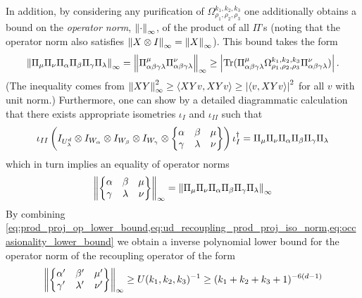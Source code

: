 \documentclass[notitlepage, 10pt]{article}
\begin{document}
In addition, by considering any purification of $\Omega_{\rho_1,\rho_2,\rho_3}^{k_1, k_2, k_3}$ one additionally obtains a bound on the \textit{operator norm}, $\left\lVert\cdot\right\rVert_{\infty}$, of the product of all $\Pi$'s (noting that the operator norm also satisfies $\left\lVert X \otimes I\right\rVert_{\infty} = \left\lVert X\right\rVert_{\infty}$).
This bound takes the form
\begin{equation}
    \label{eq:prod_proj_op_lower_bound}
    \left\lVert\Pi_{\mu}\Pi_{\nu}\Pi_{\alpha}\Pi_{\beta}\Pi_{\gamma}\Pi_{\lambda}\right\rVert_{\infty} = \left\lVert\Pi^{\mu}_{\alpha\beta\gamma\lambda}\Pi^{\nu}_{\alpha\beta\gamma\lambda}\right\rVert_{\infty} \geq \left|\operatorname{Tr}(\Pi^{\mu}_{\alpha\beta\gamma\lambda} \Omega_{\rho_1,\rho_2,\rho_3}^{k_1, k_2, k_3} \Pi^{\nu}_{\alpha\beta\gamma\lambda})\right|.
\end{equation}
(The inequality comes from $\left\lVert XY\right\rVert_{\infty}^2 \geq \braket{XY v, XY v} \geq \left|\braket{v, XYv}\right|^{2}$ for all $v$ with unit norm.)
Furthermore, one can show by a detailed diagrammatic calculation that there exists appropriate isometries $\iota_{I}$ and $\iota_{II}$ such that
\begin{equation}
    \label{eq:ud_recoupling_prod_proj_iso}
    \iota_{II} \left(I_{U^{d}_{\lambda}} \otimes I_{W_{\alpha}} \otimes I_{W_{\beta}} \otimes I_{W_{\gamma}} \otimes \begin{Bmatrix} \alpha & \beta & \mu \\ \gamma & \lambda & \nu \end{Bmatrix}\right) \iota_{I}^{\dagger} = \Pi_{\mu}\Pi_{\nu}\Pi_{\alpha}\Pi_{\beta}\Pi_{\gamma}\Pi_{\lambda}
\end{equation}
which in turn implies an equality of operator norms
\begin{equation}
    \label{eq:ud_recoupling_prod_proj_iso_norm}
    \left\lVert\begin{Bmatrix} \alpha & \beta & \mu \\ \gamma & \lambda & \nu \end{Bmatrix}\right\rVert_{\infty} = \left\lVert\Pi_{\mu}\Pi_{\nu}\Pi_{\alpha}\Pi_{\beta}\Pi_{\gamma}\Pi_{\lambda}\right\rVert_{\infty}
\end{equation}
By combining \cref{eq:prod_proj_op_lower_bound,eq:ud_recoupling_prod_proj_iso_norm,eq:occasionality_lower_bound} we obtain a inverse polynomial lower bound for the operator norm of the recoupling operator of the form
\begin{equation}
    \left\lVert\begin{Bmatrix} \alpha' & \beta' & \mu' \\ \gamma' & \lambda' & \nu' \end{Bmatrix}\right\rVert_{\infty}
    \geq U(k_1,k_2,k_3)^{-1} \geq (k_1+k_2+k_3+1)^{-6(d-1)}
\end{equation}
\end{document}
